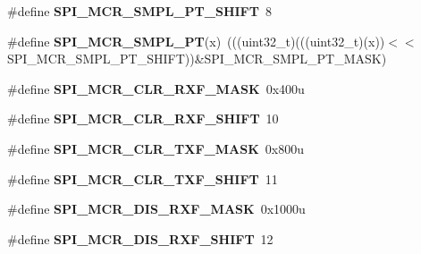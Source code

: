 \begin{DoxyCompactItemize}
\item 
\#define {\bfseries S\+P\+I\+\_\+\+M\+C\+R\+\_\+\+S\+M\+P\+L\+\_\+\+P\+T\+\_\+\+S\+H\+I\+FT}~8\hypertarget{group__SPI__Register__Masks_ga1ffc13b9075cc6b0b34ea3162d6c1b74}{}\label{group__SPI__Register__Masks_ga1ffc13b9075cc6b0b34ea3162d6c1b74}

\item 
\#define {\bfseries S\+P\+I\+\_\+\+M\+C\+R\+\_\+\+S\+M\+P\+L\+\_\+\+PT}(x)~(((uint32\+\_\+t)(((uint32\+\_\+t)(x))$<$$<$S\+P\+I\+\_\+\+M\+C\+R\+\_\+\+S\+M\+P\+L\+\_\+\+P\+T\+\_\+\+S\+H\+I\+FT))\&S\+P\+I\+\_\+\+M\+C\+R\+\_\+\+S\+M\+P\+L\+\_\+\+P\+T\+\_\+\+M\+A\+SK)\hypertarget{group__SPI__Register__Masks_ga85a76d4d3ea961f858f6eed9882bfd99}{}\label{group__SPI__Register__Masks_ga85a76d4d3ea961f858f6eed9882bfd99}

\item 
\#define {\bfseries S\+P\+I\+\_\+\+M\+C\+R\+\_\+\+C\+L\+R\+\_\+\+R\+X\+F\+\_\+\+M\+A\+SK}~0x400u\hypertarget{group__SPI__Register__Masks_gaedd370380f06f2e4bf2ca01babda8732}{}\label{group__SPI__Register__Masks_gaedd370380f06f2e4bf2ca01babda8732}

\item 
\#define {\bfseries S\+P\+I\+\_\+\+M\+C\+R\+\_\+\+C\+L\+R\+\_\+\+R\+X\+F\+\_\+\+S\+H\+I\+FT}~10\hypertarget{group__SPI__Register__Masks_gae1f4b01eb27f199a893e42f6a3d3edb7}{}\label{group__SPI__Register__Masks_gae1f4b01eb27f199a893e42f6a3d3edb7}

\item 
\#define {\bfseries S\+P\+I\+\_\+\+M\+C\+R\+\_\+\+C\+L\+R\+\_\+\+T\+X\+F\+\_\+\+M\+A\+SK}~0x800u\hypertarget{group__SPI__Register__Masks_ga5b57559246a1a4c32c53542e9f0ea2cb}{}\label{group__SPI__Register__Masks_ga5b57559246a1a4c32c53542e9f0ea2cb}

\item 
\#define {\bfseries S\+P\+I\+\_\+\+M\+C\+R\+\_\+\+C\+L\+R\+\_\+\+T\+X\+F\+\_\+\+S\+H\+I\+FT}~11\hypertarget{group__SPI__Register__Masks_ga0f0a133d00c115835f0b50c334c104cf}{}\label{group__SPI__Register__Masks_ga0f0a133d00c115835f0b50c334c104cf}

\item 
\#define {\bfseries S\+P\+I\+\_\+\+M\+C\+R\+\_\+\+D\+I\+S\+\_\+\+R\+X\+F\+\_\+\+M\+A\+SK}~0x1000u\hypertarget{group__SPI__Register__Masks_ga27dfc23fb0551340c07676e7092267d4}{}\label{group__SPI__Register__Masks_ga27dfc23fb0551340c07676e7092267d4}

\item 
\#define {\bfseries S\+P\+I\+\_\+\+M\+C\+R\+\_\+\+D\+I\+S\+\_\+\+R\+X\+F\+\_\+\+S\+H\+I\+FT}~12\hypertarget{group__SPI__Register__Masks_gaea17770537c6e387ed266e662f5e9d49}{}\label{group__SPI__Register__Masks_gaea17770537c6e387ed266e662f5e9d49}


\end{DoxyCompactItemize}
